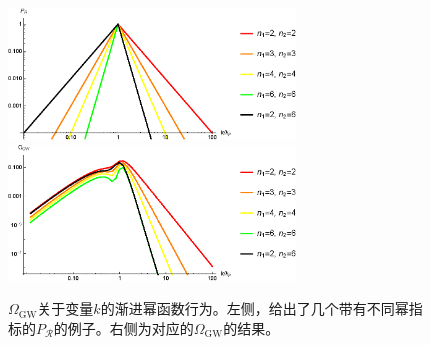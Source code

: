\begin{figure}
  \includegraphics[width=3in]{Img/PR.eps}
  \includegraphics[width=3in]{Img/omega.eps}
  \caption{$\Omega_{\text{GW}}$关于变量$k$的渐进幂函数行为。左侧，给出了几个带有不同幂指标的$P_{\mathcal{R}}$的例子。右侧为对应的$\Omega_{\text{GW}}$的结果。}\label{fig:label}
\end{figure}

